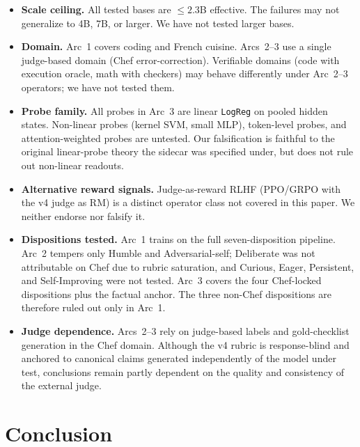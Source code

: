 \documentclass[11pt,a4paper]{article}
\begin{document}
\begin{itemize}[leftmargin=*]
\item \textbf{Scale ceiling.} All tested bases are $\leq 2.3$B effective. The failures may not generalize to 4B, 7B, or larger. We have not tested larger bases.
\item \textbf{Domain.} Arc~1 covers coding and French cuisine. Arcs~2--3 use a single judge-based domain (Chef error-correction). Verifiable domains (code with execution oracle, math with checkers) may behave differently under Arc~2--3 operators; we have not tested them.
\item \textbf{Probe family.} All probes in Arc~3 are linear \texttt{LogReg} on pooled hidden states. Non-linear probes (kernel SVM, small MLP), token-level probes, and attention-weighted probes are untested. Our falsification is faithful to the original linear-probe theory the sidecar was specified under, but does not rule out non-linear readouts.
\item \textbf{Alternative reward signals.} Judge-as-reward RLHF (PPO/GRPO with the v4 judge as RM) is a distinct operator class not covered in this paper. We neither endorse nor falsify it.
\item \textbf{Dispositions tested.} Arc~1 trains on the full seven-disposition pipeline. Arc~2 tempers only Humble and Adversarial-self; Deliberate was not attributable on Chef due to rubric saturation, and Curious, Eager, Persistent, and Self-Improving were not tested. Arc~3 covers the four Chef-locked dispositions plus the factual anchor. The three non-Chef dispositions are therefore ruled out only in Arc~1.
\item \textbf{Judge dependence.} Arcs~2--3 rely on judge-based labels and gold-checklist generation in the Chef domain. Although the v4 rubric is response-blind and anchored to canonical claims generated independently of the model under test, conclusions remain partly dependent on the quality and consistency of the external judge.
\end{itemize}

\section{Conclusion}
\end{document}
